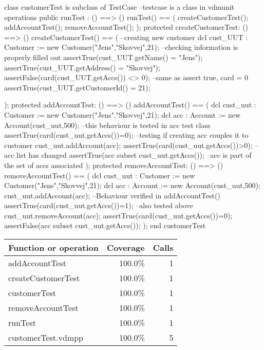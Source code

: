 \documentclass[a4paper]{article}
\begin{document}
\title{}
\author{}
\begin{vdm_al}

class customerTest is subclass of TestCase --testcase is a class in vdmunit
operations
    public runTest : () ==> ()
    runTest() == (
        createCustomerTest();
        addAccountTest();
        removeAccountTest();
    );
    protected createCustomerTest: () ==> ()
    createCustomerTest() == (
      --creating new customer
      dcl cust_UUT : Customer := new Customer("Jens","Skovvej",21);
      --checking information is properly filled out
      assertTrue(cust_UUT.getName() = "Jens");
      assertTrue(cust_UUT.getAddress() = "Skovvej");
      assertFalse(card(cust_UUT.getAccs()) <> 0); --same as assert true, card = 0
      assertTrue(cust_UUT.getCustomerId() = 21);

    );
    protected addAccountTest: () ==> ()
    addAccountTest() == (
      dcl cust_uut : Customer := new Customer("Jens","Skovvej",21);
      dcl acc : Account := new Account(cust_uut,500); --this behaviour is tested in acc test class
      assertTrue(card(cust_uut.getAccs())=0); --testing if creating acc couples it to customer
      cust_uut.addAccount(acc);
      assertTrue(card(cust_uut.getAccs())>0); --acc list has changed
      assertTrue({acc} subset cust_uut.getAccs()); --acc is part of the set of accs associated
    );
    protected removeAccountTest: () ==> ()
    removeAccountTest() == (
      dcl cust_uut : Customer := new Customer("Jens","Skovvej",21);
      dcl acc : Account := new Account(cust_uut,500); 
      cust_uut.addAccount(acc); --Behaviour verified in addAccountTest()
      assertTrue(card(cust_uut.getAccs())=1); --also tested above
      cust_uut.removeAccount(acc);
      assertTrue(card(cust_uut.getAccs())=0);
      assertFalse({acc} subset cust_uut.getAccs());
    );
end customerTest
\end{vdm_al}
\bigskip
\begin{longtable}{|l|r|r|}
\hline
Function or operation & Coverage & Calls \\
\hline
\hline
addAccountTest & 100.0\% & 1 \\
\hline
createCustomerTest & 100.0\% & 1 \\
\hline
customerTest & 100.0\% & 1 \\
\hline
removeAccountTest & 100.0\% & 1 \\
\hline
runTest & 100.0\% & 1 \\
\hline
\hline
customerTest.vdmpp & 100.0\% & 5 \\
\hline
\end{longtable}
\end{document}
